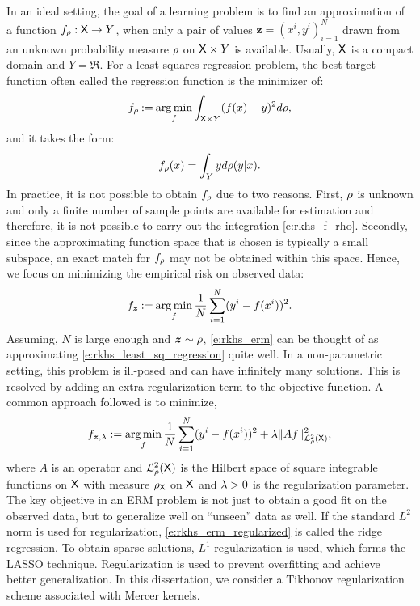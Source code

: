 In an ideal setting, the goal of a learning problem is to find an approximation of a function $f_\rho : {\sf X} \to Y$, when only a pair of values $\bm{z} = (x^i, y^i)_{i=1}^N$ drawn from an unknown probability measure $\rho$ on ${\sf X} \times Y$ is available. Usually, ${\sf X}$ is a compact domain and $Y = \Re$. For a least-squares regression problem, the best target function often called the regression function is the minimizer of:
\begin{equation}
f_\pr \eqdef \argmin_f \int_{\state \times Y} (f(x) - y) ^2 d\pr,
\label{e:rkhs_least_sq_regression}
\end{equation}
and it takes the form:
\begin{equation}
f_\pr(x) = \int_Y y d\pr(y|x).
\label{e:rkhs_f_rho}
\end{equation}
In practice, it is not possible to obtain $f_\rho$ due to two reasons. First, $\rho$ is unknown and only a finite number of sample points are available for estimation and therefore, it is not possible to carry out the integration \eqref{e:rkhs_f_rho}. Secondly, since the approximating function space that is chosen is typically a small subspace, an exact match for $f_\rho$ may not be obtained within this space. Hence, we focus on minimizing the empirical risk on observed data:
\begin{equation}
f_{\bm{z}} \eqdef \argmin_f \frac{1}{N} \sum_{i=1}^N (y^i - f(x^i))^2.
\label{e:rkhs_erm}
\end{equation}
Assuming, $N$ is large enough and $\bm{z} \sim \rho$, \eqref{e:rkhs_erm} can be thought of as approximating \eqref{e:rkhs_least_sq_regression} quite well.   In a non-parametric setting, this problem is ill-posed and can have infinitely many solutions. This is resolved by adding an extra regularization term to the objective function. 
A common approach followed is to minimize,
\begin{equation}
f_{\bm{z},\reg} := \argmin_f \frac{1}{N}\sum_{i=1}^N (y^i - f(x^i))^2 + \reg \|A f \|^2_{\mathcal{L}_{\pr}^2(\state)},
\label{e:rkhs_erm_regularized}
\end{equation}
where $A$ is an operator and $\mathcal{L}^2_{\rho}({\sf X})$ is the Hilbert space of square integrable functions on ${\sf X}$ with measure $\rho_{\sf X}$ on ${\sf X}$ and $\lambda>0$ is the regularization parameter. 
The key objective in an ERM problem is not just to obtain a good fit on the observed data, but to generalize well on ``unseen'' data as well. If the standard $L^2$ norm is used for regularization, \eqref{e:rkhs_erm_regularized} is called the ridge regression. To obtain sparse solutions, $L^1$-regularization is used, which forms the LASSO technique. Regularization is used to prevent overfitting and achieve better generalization.   In this dissertation, we consider a Tikhonov regularization scheme \cite{tikars79} associated with Mercer kernels.

